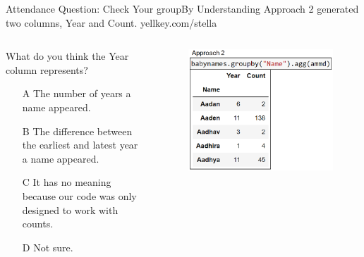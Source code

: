 \documentclass[aspectratio=169]{../latex_main/tntbeamer}  %
\begin{document}
    \begin{frame}{Attendance Question: Check Your groupBy Understanding}
        Approach 2 generated two columns, Year and Count. yellkey.com/stella
        
        \begin{columns}
            \begin{column}{.4\textwidth}
                    What do you think the Year column represents?
                    \begin{itemize}
                        \item[A]  The number of years a name appeared.
                        \item[B] The difference between the earliest and latest year a name appeared.
                        \item[C] It has no meaning because our code was only designed to work with counts.
                        \item[D] Not sure.
                    \end{itemize}
            \end{column}
            
            \begin{column}{.5\textwidth}
                    \begin{figure}
                        \includegraphics[scale=.37]{Bild23}
                    \end{figure}
            \end{column}
            
        \end{columns}
        
    \end{frame}
    
\end{document}
